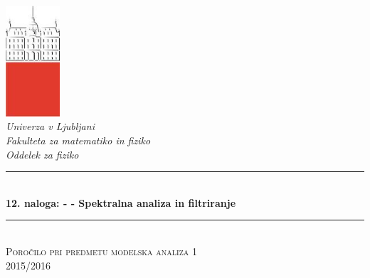 \documentclass[slovene,11pt,a4paper]{article}
\numberwithin{equation}{section} %
\numberwithin{figure}{section} %
\numberwithin{table}{section} %
\begin{document}
\begin{titlepage}

\newcommand{\HRule}{\rule{\linewidth}{0.5mm}} %

\center %


 

\includegraphics[width=2cm]{slike/aaa}\\[0.5cm]
 
\textit{Univerza v Ljubljani}\\
\textit{Fakulteta za {\color{red}matematiko in fiziko}}\\[0.5cm]

\emph{Oddelek za fiziko}\\[0.5cm] %


\HRule \\[0.4cm]
\huge {\bfseries 12. naloga: - - Spektralna analiza in filtriranje}\\[0.4cm] %
\HRule \\[0.5cm] 

 \textsc{\large Poročilo pri predmetu modelska analiza 1}\\
 \textsc{\large 2015/2016}\\[1cm] %
 

\end{titlepage}
\end{document}
